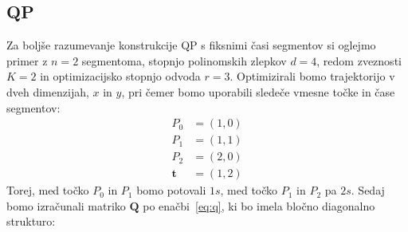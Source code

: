 \documentclass[isrm2, tisk]{fmfdelo}
\newcommand{\tvec}{\mathbf{t}}
\begin{document}
\subsection{QP}

Za boljše razumevanje konstrukcije QP s fiksnimi časi segmentov si oglejmo primer z $n = 2$ segmentoma, stopnjo polinomskih zlepkov $d = 4$, redom zveznosti $K = 2$ in optimizacijsko stopnjo odvoda $r = 3$. Optimizirali bomo trajektorijo v dveh dimenzijah, $x$ in $y$, pri čemer bomo uporabili sledeče vmesne točke in čase segmentov:
\begin{equation}
\begin{aligned}
P_0 &= (1, 0) \\
P_1 &= (1, 1) \\
P_2 &= (2, 0) \\
\tvec &= (1, 2)
\end{aligned}
\end{equation}
Torej, med točko $P_0$ in $P_1$ bomo potovali $1s$, med točko $P_1$ in $P_2$ pa $2s$. Sedaj bomo izračunali matriko $\mathbf{Q}$ po enačbi~\eqref{eq:q}, ki bo imela bločno diagonalno strukturo:
\end{document}
